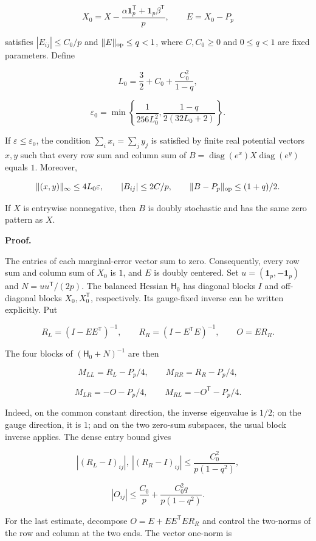 \documentclass[11pt,a4paper]{article}
\begin{document}
\[
X_0=X-\frac{\alpha\mathbf 1_p^{\mathsf T}+\mathbf 1_p\beta^{\mathsf T}}p,\qquad E=X_0-P_p
\]

satisfies \(|E_{ij}|\le C_0/p\) and \(\|E\|_{\rm op}\le q<1\), where \(C,C_0\ge0\) and \(0\le q<1\) are fixed parameters. Define

\[
L_0=\frac32+C_0+\frac{C_0^2}{1-q},
\]

\[
\varepsilon_0=\min\left\{\frac1{256L_0^2},\frac{1-q}{2(32L_0+2)}\right\}.
\]

If \(\varepsilon\le\varepsilon_0\), the condition \(\sum_i x_i=\sum_j y_j\) is satisfied by finite real potential vectors \(x,y\) such that every row sum and column sum of \(B=\operatorname{diag}(e^x)X\operatorname{diag}(e^y)\) equals \(1\). Moreover,

\[
\|(x,y)\|_\infty\le4L_0\varepsilon,\qquad |B_{ij}|\le2C/p,\qquad \|B-P_p\|_{\rm op}\le(1+q)/2.
\]

If \(X\) is entrywise nonnegative, then \(B\) is doubly stochastic and has the same zero pattern as \(X\).

\textbf{Proof.}

The entries of each marginal-error vector sum to zero. Consequently, every row sum and column sum of \(X_0\) is \(1\), and \(E\) is doubly centered. Set \(u=(\mathbf 1_p,-\mathbf 1_p)\) and \(N=uu^{\mathsf T}/(2p)\). The balanced Hessian \(\mathsf H_0\) has diagonal blocks \(I\) and off-diagonal blocks \(X_0,X_0^{\mathsf T}\), respectively. Its gauge-fixed inverse can be written explicitly. Put

\[
R_L=(I-EE^{\mathsf T})^{-1},\qquad R_R=(I-E^{\mathsf T}E)^{-1},\qquad O=ER_R.
\]

The four blocks of \((\mathsf H_0+N)^{-1}\) are then

\[
M_{LL}=R_L-P_p/4,\qquad M_{RR}=R_R-P_p/4,
\]

\[
M_{LR}=-O-P_p/4,\qquad M_{RL}=-O^{\mathsf T}-P_p/4.
\]

Indeed, on the common constant direction, the inverse eigenvalue is \(1/2\); on the gauge direction, it is \(1\); and on the two zero-sum subspaces, the usual block inverse applies. The dense entry bound gives

\[
|(R_L-I)_{ij}|,\ |(R_R-I)_{ij}|\le\frac{C_0^2}{p(1-q^2)},
\]

\[
|O_{ij}|\le\frac{C_0}{p}+\frac{C_0^2q}{p(1-q^2)}.
\]

For the last estimate, decompose \(O=E+EE^{\mathsf T}ER_R\) and control the two-norms of the row and column at the two ends. The vector one-norm is
\end{document}
